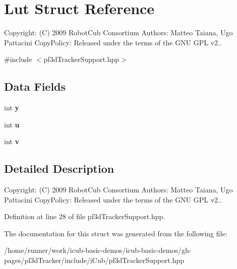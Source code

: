 \section{Lut Struct Reference}
\label{structLut}


Copyright\+: (C) 2009 Robot\+Cub Consortium Authors\+: Matteo Taiana, Ugo Pattacini Copy\+Policy\+: Released under the terms of the G\+NU G\+PL v2..  




{\ttfamily \#include $<$pf3d\+Tracker\+Support.\+hpp$>$}

\subsection*{Data Fields}
\begin{DoxyCompactItemize}
\item 
\mbox{\label{structLut_a02ec6461b84d3375c306c383481c00f2}} 
int {\bfseries y}
\item 
\mbox{\label{structLut_a0ce7d6fb23e6c8cc9eb5935cc6a39d87}} 
int {\bfseries u}
\item 
\mbox{\label{structLut_ae111fc109ad126980bd30ad3b87d4720}} 
int {\bfseries v}
\end{DoxyCompactItemize}


\subsection{Detailed Description}
Copyright\+: (C) 2009 Robot\+Cub Consortium Authors\+: Matteo Taiana, Ugo Pattacini Copy\+Policy\+: Released under the terms of the G\+NU G\+PL v2.. 

Definition at line 28 of file pf3d\+Tracker\+Support.\+hpp.



The documentation for this struct was generated from the following file\+:\begin{DoxyCompactItemize}
\item 
/home/runner/work/icub-\/basic-\/demos/icub-\/basic-\/demos/gh-\/pages/pf3d\+Tracker/include/i\+Cub/pf3d\+Tracker\+Support.\+hpp\end{DoxyCompactItemize}
